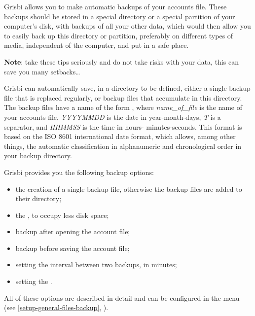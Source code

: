 Grisbi allows you to make automatic backups of your accounts file. These backups should be stored in a special directory or a special \gls{partition} of your computer's disk, with backups of all your other data, which would then allow you to easily back up this directory or partition, preferably on different types of media, independent of the computer, and put in a safe place.

\textbf{Note}:  take these tips seriously and do not take risks with your data, this can save you many setbacks\ldots

Grisbi can automatically save, in a directory to be defined, either a single backup file that is replaced regularly, or backup files that accumulate in this directory.
The backup files have a name of the form , where \emph{name\_of\_file} is the name of your accounts file, \emph{YYYYMMDD} is the date in year-month-days, \emph{T}  is a separator, and \emph{HHMMSS}  is the time in hours- minutes-seconds. This format is based on the ISO 8601 international date format, which allows, among other things, the automatic classification in alphanumeric and chronological order in your backup directory.

Grisbi provides you the following backup options:

\begin{itemize}
	\item the creation of a single backup file, otherwise the backup files are added to their directory;
	\item the , to occupy less disk space;
	\item backup after opening the account file; 
	\item backup before saving the account file; 
	\item setting the interval between two backups, in minutes;
	\item setting the .
\end{itemize}

All of these options are described in detail and can be configured in the  menu (see \vref{setup-general-files-backup}, ).


